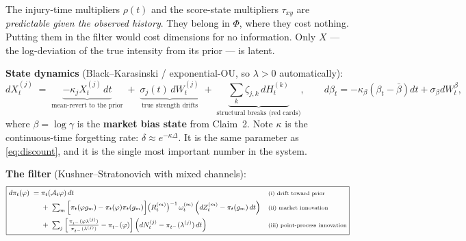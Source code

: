 \documentclass[11pt,a4paper]{article}
\theoremstyle{plain}
\begin{document}
The injury-time multipliers $\rho(t)$ and the score-state multipliers $\tau_{xy}$ are
\emph{predictable given the observed history}. They belong in $\Phi$, where they cost nothing.
Putting them in the filter would cost dimensions for no information. Only $X$ --- the log-deviation
of the true intensity from its prior --- is latent.

\medskip\noindent\textbf{State dynamics} (Black--Karasinski / exponential-OU, so $\lambda>0$ automatically):
\begin{equation}
  dX^{(j)}_t \;=\;
  \underbrace{-\kappa_j X^{(j)}_t\,dt}_{\text{mean-revert to the prior}}
  \;+\; \underbrace{\sigma_j(t)\,dW^{(j)}_t}_{\text{true strength drifts}}
  \;+\; \underbrace{\textstyle\sum_k \zeta_{j,k}\,dH^{(k)}_t}_{\text{structural breaks (red cards)}},
  \qquad
  d\beta_t = -\kappa_\beta(\beta_t - \bar\beta)dt + \sigma_\beta dW^\beta_t,
\label{eq:sde}
\end{equation}
where $\beta = \log\gamma$ is the \textbf{market bias state} from Claim~2. Note
$\kappa$ is the continuous-time forgetting rate: $\delta \approx e^{-\kappa\Delta}$. It is the
same parameter as \eqref{eq:discount}, and it is the single most important number in the system.

\medskip\noindent\textbf{The filter} (Kushner--Stratonovich with mixed channels):
\begin{equation}
\small
\boxed{
\begin{aligned}
d\pi_t(\varphi) \;=\;& \pi_t(\mathcal{A}_t\varphi)\,dt
&&\text{\scriptsize (i) drift toward prior}\\
&+\; \textstyle\sum_m \Big[\pi_t(\varphi g_m) - \pi_t(\varphi)\pi_t(g_m)\Big]
   \big(R^{(m)}_t\big)^{-1}\,\omega^{(m)}_t\,
   \Big(dZ^{(m)}_t - \pi_t(g_m)\,dt\Big)
&&\text{\scriptsize (ii) market innovation}\\
&+\; \textstyle\sum_j \left[\frac{\pi_{t^-}(\varphi\lambda^{(j)})}{\pi_{t^-}(\lambda^{(j)})} - \pi_{t^-}(\varphi)\right]
   \Big(dN^{(j)}_t - \pi_{t^-}(\lambda^{(j)})\,dt\Big)
&&\text{\scriptsize (iii) point-process innovation}
\end{aligned}}
\label{eq:ks}
\end{equation}
\end{document}
